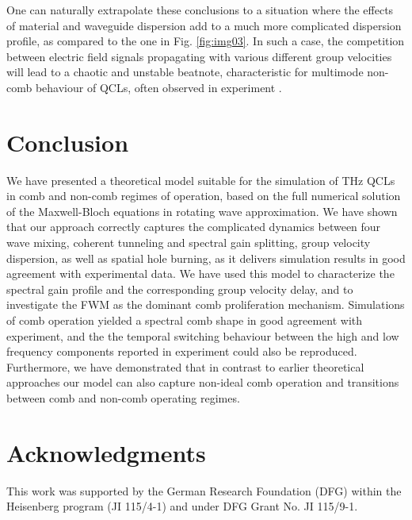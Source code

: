 \documentclass[10pt]{article}
\begin{document}
	One can naturally extrapolate these conclusions to a situation where the
	effects of material and waveguide dispersion add to a much more complicated
	dispersion profile, as compared to the one in Fig. \ref{fig:img03}. In such a
	case, the competition between electric field signals propagating with various
	different group velocities will lead to a chaotic and unstable beatnote,
	characteristic for multimode non-comb behaviour of QCLs, often observed in
	experiment \cite{burghoff2014terahertz,wienold2014evidence,rosch2015octave}.
	
	\section{Conclusion}
	We have presented a theoretical model suitable for the simulation of THz QCLs
	in comb and non-comb regimes of operation, based on the full numerical
	solution of the Maxwell-Bloch equations in rotating wave approximation. We
	have shown that our approach correctly captures the complicated dynamics
	between four wave mixing, coherent tunneling and spectral gain splitting,
	group velocity dispersion, as well as spatial hole burning, as it delivers
	simulation results in good agreement with experimental data. We have used this
	model to characterize the spectral gain profile and the corresponding group
	velocity delay, and to investigate the FWM as the dominant comb proliferation
	mechanism. Simulations of comb operation yielded a spectral comb shape in good
	agreement with experiment, and the the temporal switching behaviour between
	the high and low frequency components reported in experiment could also be
	reproduced. Furthermore, we have demonstrated that in contrast to earlier theoretical approaches our model can also capture non-ideal comb operation and transitions between comb and
	non-comb operating regimes.
	
	\section*{Acknowledgments}
	This work was supported by the German Research Foundation (DFG) within the
	Heisenberg program (JI 115/4-1) and under DFG Grant No. JI 115/9-1.
\end{document}
